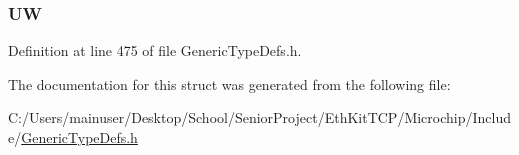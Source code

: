 \hypertarget{struct_q_w_o_r_d___v_a_l_1_1_____p_a_c_k_e_d_aa5825a5a85c9727c5decfc258d403f54}{}
\subsubsection[{U\+W}]{ U\+W}\label{struct_q_w_o_r_d___v_a_l_1_1_____p_a_c_k_e_d_aa5825a5a85c9727c5decfc258d403f54}


Definition at line 475 of file Generic\+Type\+Defs.\+h.



The documentation for this struct was generated from the following file\+:\begin{DoxyCompactItemize}
\item 
C\+:/\+Users/mainuser/\+Desktop/\+School/\+Senior\+Project/\+Eth\+Kit\+T\+C\+P/\+Microchip/\+Include/\hyperlink{_generic_type_defs_8h}{Generic\+Type\+Defs.\+h}\end{DoxyCompactItemize}

